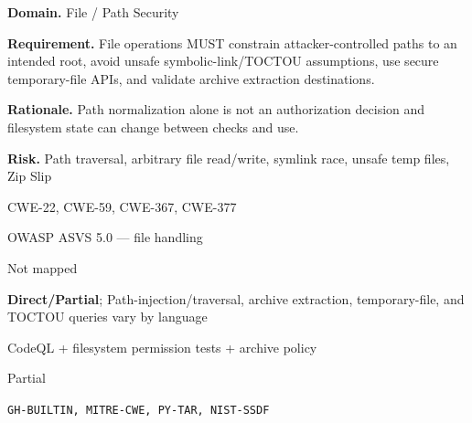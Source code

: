 \documentclass[10pt,letterpaper]{article}
\newcommand{\prioritybadge}[2]{\tcbox[on line,boxrule=0pt,arc=1.2mm,boxsep=0.7mm,left=1mm,right=1mm,top=0.4mm,bottom=0.4mm,colback=#2!12,coltext=#2]{\scriptsize\bfseries #1}}
\begin{document}
\begin{rulebox}[title={\texttt{SCS-ALL-FILE-001} \hfill \prioritybadge{High Priority}{High}}]
\textbf{Domain.} File / Path Security

\textbf{Requirement.} File operations MUST constrain attacker-controlled paths to an intended root, avoid unsafe symbolic-link/TOCTOU assumptions, use secure temporary-file APIs, and validate archive extraction destinations.

\textbf{Rationale.} Path normalization alone is not an authorization decision and filesystem state can change between checks and use.

\textbf{Risk.} Path traversal, arbitrary file read/write, symlink race, unsafe temp files, Zip Slip

\begin{description}[leftmargin=2.65cm,labelwidth=2.3cm,style=nextline,itemsep=1pt,topsep=3pt]
  \item[CWE] CWE-22, CWE-59, CWE-367, CWE-377
  \item[OWASP] OWASP ASVS 5.0 --- file handling
  \item[CERT] Not mapped
  \item[CodeQL] \textbf{Direct/Partial}; Path-injection/traversal, archive extraction, temporary-file, and TOCTOU queries vary by language
  \item[Enforcement] CodeQL + filesystem permission tests + archive policy
  \item[Automation] Partial
  \item[Sources] \texttt{GH-BUILTIN, MITRE-CWE, PY-TAR, NIST-SSDF}
\end{description}
\end{rulebox}
\end{document}
